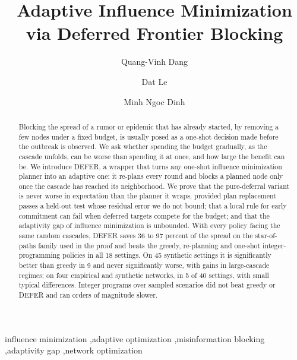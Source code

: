 \documentclass[preprint,11pt]{elsarticle}
\theoremstyle{definition}
\theoremstyle{remark}
\begin{document}
\begin{frontmatter}
\title{Adaptive Influence Minimization via Deferred Frontier Blocking}
\author[a]{Quang-Vinh Dang}
\author[b]{Dat Le}
\author[c]{Minh Ngoc Dinh}

\begin{abstract}
Blocking the spread of a rumor or epidemic that has already started, by removing a few nodes under a fixed budget, is usually posed as a one-shot decision made before the outbreak is observed. We ask whether spending the budget gradually, as the cascade unfolds, can be worse than spending it at once, and how large the benefit can be. We introduce DEFER, a wrapper that turns any one-shot influence minimization planner into an adaptive one: it re-plans every round and blocks a planned node only once the cascade has reached its neighborhood. We prove that the pure-deferral variant is never worse in expectation than the planner it wraps, provided plan replacement passes a held-out test whose residual error we do not bound; that a local rule for early commitment can fail when deferred targets compete for the budget; and that the adaptivity gap of influence minimization is unbounded. With every policy facing the same random cascades, DEFER saves 36 to 97 percent of the spread on the star-of-paths family used in the proof and beats the greedy, re-planning and one-shot integer-programming policies in all 18 settings. On 45 synthetic settings it is significantly better than greedy in 9 and never significantly worse, with gains in large-cascade regimes; on four empirical and synthetic networks, in 5 of 40 settings, with small typical differences. Integer programs over sampled scenarios did not beat greedy or DEFER and ran orders of magnitude slower.
\end{abstract}

\begin{keyword}
influence minimization \sep adaptive optimization \sep misinformation blocking \sep adaptivity gap \sep network optimization
\end{keyword}
\end{frontmatter}
\end{document}

